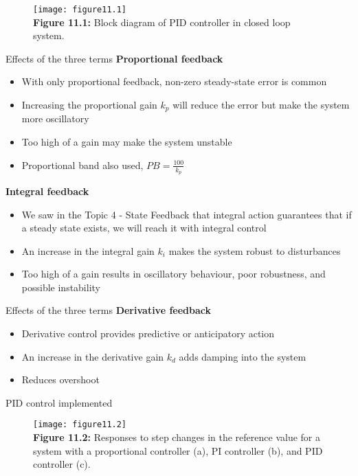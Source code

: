 \documentclass{beamer-control}
\begin{document}
\begin{frame}
\begin{figure}
	\centering
	\texttt{[image: figure11.1]}
	\\
	\textbf{Figure 11.1:} Block diagram of PID controller in closed loop system. 
\end{figure}
\end{frame}


\begin{frame}{Effects of the three terms}
\textbf{Proportional feedback}
\begin{itemize}
\item With only proportional feedback, non-zero steady-state error is common
\item Increasing the proportional gain $k_p$ will reduce the error but make the system more oscillatory
\item Too high of a gain may make the system unstable 
\item Proportional band also used, $PB=\tfrac{100}{k_p}$
\end{itemize}
\textbf{Integral feedback}
\begin{itemize}
	\item We saw in the Topic 4 - State Feedback that integral action guarantees that if a steady state exists, we will reach it with integral control
	\item An increase in the integral gain $k_i$ makes the system robust to disturbances
	\item Too high of a gain results in oscillatory behaviour, poor robustness, and possible instability
\end{itemize}
\end{frame}


\begin{frame}{Effects of the three terms}
	\textbf{Derivative feedback}
	\begin{itemize}
		\item Derivative control provides predictive or anticipatory action
		\item An increase in the derivative gain $k_d$ adds damping into the system
		\item Reduces overshoot
	\end{itemize}
\end{frame}

\begin{frame}{PID control implemented}
\begin{figure}
	\centering
	\texttt{[image: figure11.2]}
	\\
	\textbf{Figure 11.2:} Responses to step changes in the reference value for a system with a proportional controller (a), PI controller (b), and PID controller (c).
\end{figure}
\end{frame}


\SUMMARYFRAME
\FINALE
\end{document}
